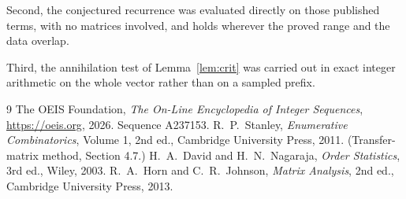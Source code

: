 \documentclass[11pt,a4paper]{article}
\theoremstyle{plain}
\theoremstyle{definition}
\begin{document}
Second, the conjectured recurrence was evaluated directly on those published terms, with no
matrices involved, and holds wherever the proved range and the data overlap.

Third, the annihilation test of Lemma~\ref{lem:crit} was carried out in exact integer
arithmetic on the whole vector rather than on a sampled prefix.

\begin{thebibliography}{9}
 The OEIS Foundation, \emph{The On-Line Encyclopedia of Integer
Sequences}, \url{https://oeis.org}, 2026. Sequence A237153.
 R.~P.~Stanley, \emph{Enumerative Combinatorics}, Volume 1, 2nd ed.,
Cambridge University Press, 2011. (Transfer-matrix method, Section 4.7.)
 H.~A.~David and H.~N.~Nagaraja, \emph{Order Statistics}, 3rd ed., Wiley,
2003.
 R.~A.~Horn and C.~R.~Johnson, \emph{Matrix Analysis}, 2nd ed., Cambridge
University Press, 2013.
\end{thebibliography}
\end{document}
